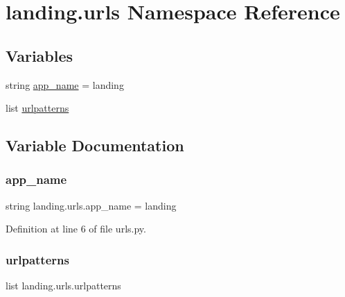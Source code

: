 \hypertarget{namespacelanding_1_1urls}{}\section{landing.\+urls Namespace Reference}
\label{namespacelanding_1_1urls}
\subsection*{Variables}
\begin{DoxyCompactItemize}
\item 
string \mbox{\hyperlink{namespacelanding_1_1urls_a19bbbacd154bcd98ff83cc70831e086a}{app\+\_\+name}} = \textquotesingle{}landing\textquotesingle{}
\item 
list \mbox{\hyperlink{namespacelanding_1_1urls_ac0bd14d2987799b6383f0a1058f7043e}{urlpatterns}}
\end{DoxyCompactItemize}


\subsection{Variable Documentation}
\mbox{\label{namespacelanding_1_1urls_a19bbbacd154bcd98ff83cc70831e086a}} 
\subsubsection{\texorpdfstring{app\+\_\+name}{app\_name}}
{\footnotesize\ttfamily string landing.\+urls.\+app\+\_\+name = \textquotesingle{}landing\textquotesingle{}}



Definition at line 6 of file urls.\+py.

\mbox{\label{namespacelanding_1_1urls_ac0bd14d2987799b6383f0a1058f7043e}} 
\subsubsection{\texorpdfstring{urlpatterns}{urlpatterns}}
{\footnotesize\ttfamily list landing.\+urls.\+urlpatterns}

